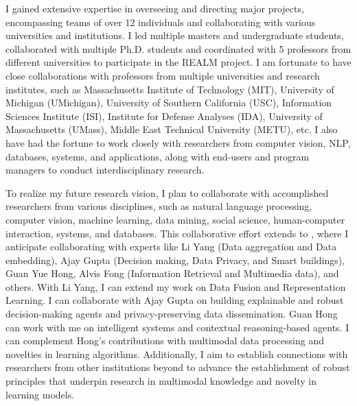 \setlength\parindent{0pt}

I gained extensive expertise in overseeing and directing major projects, encompassing teams of over 12 individuals and collaborating with various universities and institutions.
I led multiple masters and undergraduate students, collaborated with multiple Ph.D. students and coordinated with 5 professors from different universities to participate in the REALM project. I am fortunate to have close collaborations with professors from multiple universities and research institutes, such as Massachusetts Institute of Technology (MIT), University of Michigan (UMichigan), University of Southern California (USC), Information Sciences Institute (ISI), Institute for Defense Analyses (IDA), University of Massachusetts (UMass), Middle East Technical University (METU), etc. I also have had the fortune to work closely with researchers from computer vision, NLP, databases, systems, and applications, along with end-users and program managers to conduct interdisciplinary research. 
%
%
%
%

%
To realize my future research vision, I plan to collaborate with accomplished researchers from various disciplines, such as natural language processing, computer vision, machine learning, data mining, social science, human-computer interaction, systems, and databases. 
This collaborative effort extends to \shortInstitutionName{}, where I anticipate collaborating with experts like Li Yang (Data aggregation and Data embedding), Ajay Gupta (Decision making, Data Privacy, and Smart buildings), Guan Yue Hong, Alvis Fong (Information Retrieval and Multimedia data), and others. With Li Yang, I can extend my work on Data Fusion and Representation Learning. I can collaborate with Ajay Gupta on building explainable and robust decision-making agents and privacy-preserving data dissemination. Guan Hong can work with me on intelligent systems and contextual reasoning-based agents. I can complement Hong's contributions with multimodal data processing and novelties in learning algorithms.
%
%
Additionally, I aim to establish connections with researchers from other 
institutions beyond \shortInstitutionName{} to advance the establishment of robust principles that underpin research in multimodal knowledge and novelty in learning models. 

